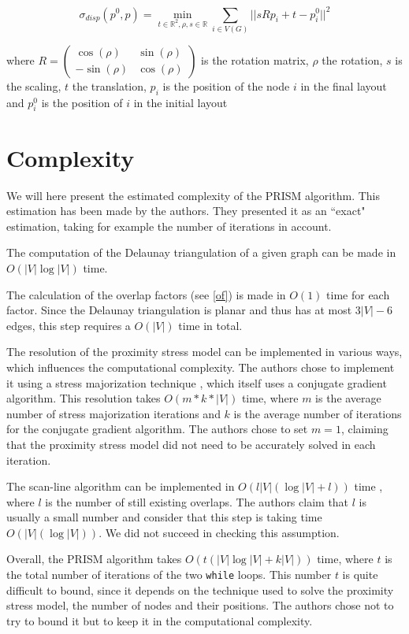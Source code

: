 \documentclass[12pt]{report}
\begin{document}
\[\sigma_{disp}(p^0, p) = \min_{t \in \mathbb{R}^2, \rho, s \in \mathbb{R}} 
\sum_{i \in V(G)} || s R p_i + t - p_i^0||^2 \]

where $R = \begin{pmatrix} \cos(\rho) & \sin(\rho) \\ -\sin(\rho) & \cos(\rho) \end{pmatrix}$ is the rotation matrix, $\rho$ the rotation, $s$ is the scaling, $t$ the translation, $p_i$ is the position of the node $i$ in the final layout and $p_i^0$ is the position of $i$ in the initial layout

\section{Complexity}

We will here present the estimated complexity of the PRISM algorithm. This estimation has been made by the authors. They presented it as an ``exact" estimation, taking for example the number of iterations in account.

The computation of the Delaunay triangulation of a given graph can be made in $O(|V| \log |V|)$ time.

The calculation of the overlap factors (see \ref{of}) is made in $O(1)$ time for each factor. Since the Delaunay triangulation is planar and thus has at most $3|V| -6$ edges, this step requires a $O(|V|)$ time in total.

The resolution of the proximity stress model can be implemented in various ways, which influences the computational complexity. The authors chose to implement it using a stress majorization technique \cite{Gansner05}, which itself uses a conjugate gradient algorithm. This resolution takes $O(m*k*|V|)$ time, where $m$ is the average number of stress majorization iterations and $k$ is the average number of iterations for the conjugate gradient algorithm. The authors chose to set $m =1$, claiming that the proximity stress model did not need to be accurately solved in each iteration.

The scan-line algorithm can be implemented in $O(l |V| (\log |V| + l))$ time \cite{VPSC06}, where $l$ is the number of still existing overlaps. The authors claim that $l$ is usually a small number and consider that this step is taking time $O(|V| (\log |V|))$. We did not succeed in checking this assumption.

Overall, the PRISM algorithm takes $O(t(|V| \log |V| + k|V|))$ time, where $t$ is the total number of iterations of the two \texttt{while} loops. This number $t$ is quite difficult to bound, since it depends on the technique used to solve the proximity stress model, the number of nodes and their positions. The authors chose not to try to bound it but to keep it in the computational complexity.
\end{document}
